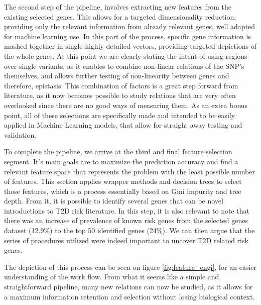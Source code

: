 The second step of the pipeline, involves extracting new features from the existing selected genes. This allows for a targeted dimensionality reduction, providing only the relevant information from already relevant genes, well adapted for machine learning use. In this part of the process, specific gene information is mashed together in single highly detailed vectors, providing targeted depictions of the whole genes. At this point we are clearly stating the intent of using regions over single variants, as it enables to combine non-linear relations of the \gls{SNP}'s themselves, and allows further testing of non-linearity between genes and therefore, epistasis. This combination of factors is a great step forward from literature, as it now becomes possible to study relations that are very often overlooked since there are no good ways of measuring them. As an extra bonus point, all of these selections are specifically made and intended to be easily applied in Machine Learning models, that allow for straight away testing and validation. 

To complete the pipeline, we arrive at the third and final feature selection segment. It's main goals are to maximize the prediction accuracy and find a relevant feature space that represents the problem with the least possible number of features. This section applies wrapper methods and decision trees to select those features, which is a process essentially based on Gini impurity and tree depth. From it, it is possible to identify several genes that can be novel introductions to \gls{T2D} risk literature. In this step, it is also relevant to note that there was an increase of prevalence of known risk genes from the selected genes dataset (12.9\%) to the top 50 identified genes (24\%). We can then argue that the series of procedures utilized were indeed important to uncover \gls{T2D} related risk genes. 

The depiction of this process can be seen on figure \ref{fig:feature_engi}, for an easier understanding of the work flow. From what it seems like a simple and straightforward pipeline, many new relations can now be studied, as it allows for a maximum information retention and selection without losing biological context.


